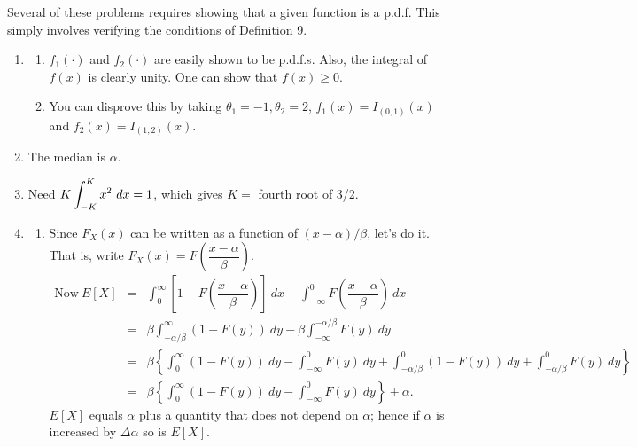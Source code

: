 \noindent Several of these problems requires showing that a given function is a p.d.f.  This simply involves verifying the conditions of Definition 9.
\begin{enumerate}
	\item[1.] \begin{enumerate}
		
		\item $f_1(\cdot)$ and $f_2(\cdot)$ are easily shown to be p.d.f.s.  Also, the integral of $f(x)$ is clearly unity.  One can show that $f(x) \ge 0$.
		
		\item You can disprove this by taking $\theta_1 = -1, \theta_2 = 2$, $f_1(x) = I_{(0,1)}(x)$ and $f_2(x) = I_{(1,2)}(x)$.
		
	\end{enumerate}

	\item[2.] The median is $\alpha$.
	
	\item[3.] Need $\displaystyle K \int_{-K}^{K} x^2\ dx = 1$, which gives $K=$ fourth root of 3/2.
	
	\item[4.] \begin{enumerate}
	
		\item Since $F_X(x)$ can be written as a function of $(x- \alpha)/\beta$, let's do it.  That is, write $F_X(x) = F\left(\dfrac{x-\alpha}{\beta}\right)$.
		\begin{eqnarray*}
		\text{Now}\ E[X] &=& \int_{0}^{\infty} \left[ 1 - F\left(\dfrac{x- \alpha}{\beta}\right) \right]\ dx- \int_{-\infty}^{0} F\left(\dfrac{x- \alpha}{\beta}\right)\ dx \\
		&=& \beta \int_{-\alpha/\beta}^{\infty}(1- F(y))\ dy- \beta \int_{-\infty}^{-\alpha/\beta} F(y)\ dy \\
		&=& \beta \left\{ \int_{0}^{\infty} (1- F(y))\ dy - \int_{-\infty}^{0} F(y)\ dy + \int_{-\alpha/\beta}^{0}(1- F(y))\ dy +  \int_{-\alpha/\beta}^{0} F(y)\ dy \right\} \\
		&=&  \beta \left\{ \int_{0}^{\infty} (1- F(y))\ dy - \int_{-\infty}^{0} F(y)\ dy  \right\} + \alpha. 
		\end{eqnarray*}
		$E[X]$ equals $\alpha$ plus a quantity that does not depend on $\alpha$; hence if $\alpha$ is increased by $\Delta\alpha$ so is $E[X]$.
		
		\end{enumerate} 
		

\end{enumerate}
